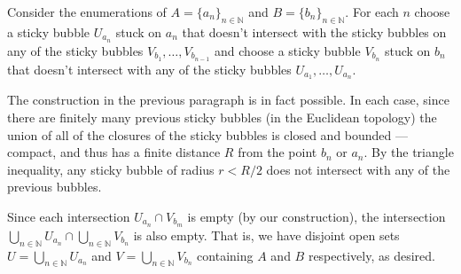 \documentclass[12 pt, letterpaper]{hmcpset}
\begin{document}
\begin{solution}
	Consider the enumerations of $A = \{ a_{n} \}_{n \in \mathbb{N}}$ and $B = \{ b_{n} \}_{n \in \mathbb{N}}$. For each $n$ choose a sticky bubble $U_{a_{n}}$ stuck on $a_{n}$ that doesn't intersect with the sticky bubbles on any of the sticky bubbles $V_{b_{1}}, \dots, V_{b_{n - 1}}$ and choose a sticky bubble $V_{b_{n}}$ stuck on $b_{n}$ that doesn't intersect with any of the sticky bubbles $U_{a_{1}}, \dots, U_{a_{n}}$. 

	The construction in the previous paragraph is in fact possible. In each case, since there are finitely many previous sticky bubbles (in the Euclidean topology) the union of all of the closures of the sticky bubbles is closed and bounded --- compact, and thus has a finite distance $R$ from the point $b_{n}$ or $a_{n}$. By the triangle inequality, any sticky bubble of radius $r < R / 2$ does not intersect with any of the previous bubbles.

	Since each intersection $U_{a_{n}} \cap V_{b_{m}}$ is empty (by our construction), the intersection $\bigcup_{n \in \mathbb{N}} U_{a_{n}} \cap \bigcup_{n \in \mathbb{N}} V_{b_{n}}$ is also empty. That is, we have disjoint open sets $U = \bigcup_{n \in \mathbb{N}} U_{a_{n}}$ and $V = \bigcup_{n \in \mathbb{N}} V_{b_{n}}$ containing $A$ and $B$ respectively, as desired.
\end{solution}
\end{document}
